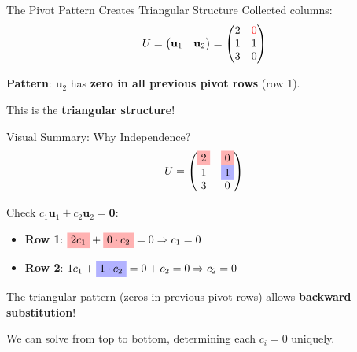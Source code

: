 \documentclass[10pt]{beamer}
\theoremstyle{definition}
\newcommand{\x}[1]{\alert{\textbf{#1}}}
\begin{document}
\begin{frame}[fragile]{The Pivot Pattern Creates Triangular Structure}
Collected columns:
$$U = \begin{pmatrix} \mathbf{u}_1 & \mathbf{u}_2 \end{pmatrix} = \begin{pmatrix} 2 & \textcolor{red}{0} \\ 1 & 1 \\ 3 & 0 \end{pmatrix}$$

\vfill
\begin{center}
\end{center}

\vfill
\x{Pattern}: $\mathbf{u}_2$ has \x{zero in all previous pivot rows} (row 1).

This is the \x{triangular structure}!
\end{frame}

\begin{frame}{Visual Summary: Why Independence?}
$$U = \begin{pmatrix}
\tikz[baseline=(char.base)]{\node[fill=red!30] (char) {2};} & \tikz[baseline=(char.base)]{\node[fill=red!30] (char) {0};} \\
1 & \tikz[baseline=(char.base)]{\node[fill=blue!30] (char) {1};} \\
3 & 0
\end{pmatrix}$$

\vfill
Check $c_1\mathbf{u}_1 + c_2\mathbf{u}_2 = \mathbf{0}$:

\begin{itemize}
\item \x{Row 1}: $\tikz[baseline=(char.base)]{\node[fill=red!30] (char) {$2c_1$};} + \tikz[baseline=(char.base)]{\node[fill=red!30] (char) {$0 \cdot c_2$};} = 0 \Rightarrow c_1 = 0$
\item \x{Row 2}: $1c_1 + \tikz[baseline=(char.base)]{\node[fill=blue!30] (char) {$1 \cdot c_2$};} = 0 + c_2 = 0 \Rightarrow c_2 = 0$
\end{itemize}

\vfill
The triangular pattern (zeros in previous pivot rows) allows \x{backward substitution}!

\vfill
We can solve from top to bottom, determining each $c_i = 0$ uniquely.
\end{frame}
\end{document}
